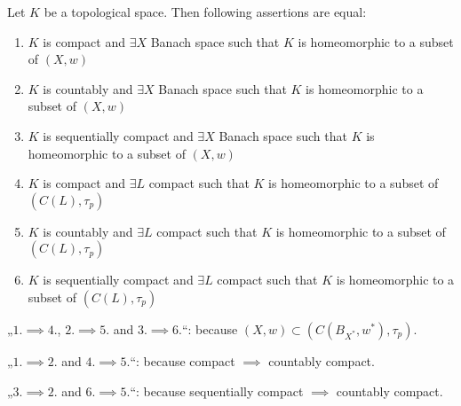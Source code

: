 \documentclass[12pt]{article}					%
\begin{document}
\begin{veta}
	Let $K$ be a topological space. Then following assertions are equal:
	\begin{enumerate}
		\item $K$ is compact and $\exists X$ Banach space such that $K$ is homeomorphic to a subset of $(X, w)$
		\item $K$ is countably and $\exists X$ Banach space such that $K$ is homeomorphic to a subset of $(X, w)$
		\item $K$ is sequentially compact and $\exists X$ Banach space such that $K$ is homeomorphic to a subset of $(X, w)$
		
		\item $K$ is compact and $\exists L$ compact such that $K$ is homeomorphic to a subset of $(C(L), τ_p)$
		\item $K$ is countably and $\exists L$ compact such that $K$ is homeomorphic to a subset of $(C(L), τ_p)$
		\item $K$ is sequentially compact and $\exists L$ compact such that $K$ is homeomorphic to a subset of $(C(L), τ_p)$
	\end{enumerate}

	\begin{dukazin}
		„$1. \implies 4.$, $2. \implies 5.$ and $3. \implies 6.$“: because $(X, w) \subset (C(B_{X^*}, w^*), τ_p)$.

		„$1. \implies 2.$ and $4. \implies 5.$“: because compact $\implies$ countably compact.
		
		„$3. \implies 2.$ and $6. \implies 5.$“: because sequentially compact $\implies$ countably compact.
	\end{dukazin}
\end{veta}
\end{document}
